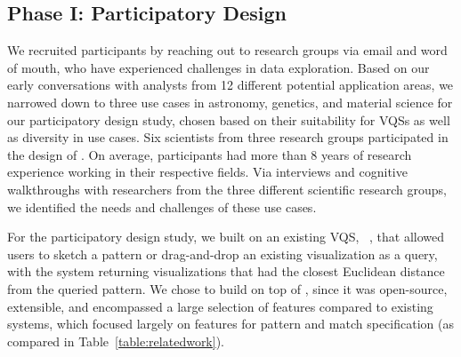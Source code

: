 \vspace{-10pt}

\subsection{Phase I: Participatory Design}
\par We recruited participants by reaching out to research groups via email and word of mouth, who have experienced challenges in data exploration. Based on our early conversations with analysts from 12 different potential application areas, we narrowed down to three use cases in astronomy, genetics, and material science for our participatory design study, chosen based on their suitability for VQSs as well as diversity in use cases. Six scientists from three research groups participated in the design of \zv. On average, participants had more than 8 years of research experience working in their respective fields. Via interviews and cognitive walkthroughs with researchers from the three different scientific research groups, we identified the needs and challenges of these use cases. 
\par For the participatory design study, we built on an existing VQS, \zv~\cite{Siddiqui2017,Siddiqui2017VLDB}, that allowed users to sketch a pattern or drag-and-drop an existing visualization as a query, with the system returning visualizations that had the closest Euclidean distance from the queried pattern. We chose to build on top of \zv, since it was open-source, extensible, and encompassed a large selection of features compared to existing systems, which focused largely on features for pattern and match specification (as compared in Table~\ref{table:relatedwork}).


